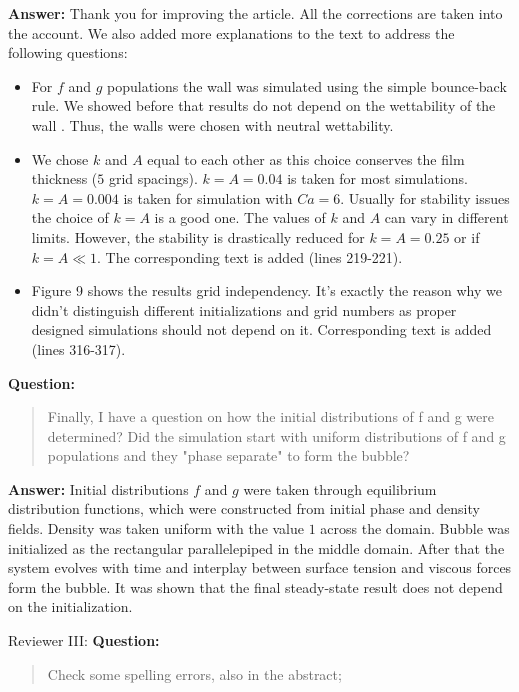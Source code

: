 \documentclass{article}
\begin{document}
\textbf{Answer:} Thank you for improving the article. All the corrections are taken into the
account. We also added more explanations to the text to address the following questions:
\begin{itemize}
 \item For $f$ and $g$ populations the wall was simulated using the simple bounce-back rule. We
showed before that results do not depend on the wettability of the wall
\cite{kuzmin-binary2d}. Thus, the walls were chosen with neutral wettability. 
 \item We chose $k$ and $A$ equal to each other as this choice conserves the film thickness ($5$
grid spacings). $k=A=0.04$ is taken for most simulations. $k=A=0.004$ is taken for simulation with 
$Ca=6$. Usually for stability issues the choice of $k=A$ is a good one. The values of $k$ and $A$
can vary in different limits. However, the stability is drastically reduced for $k=A=0.25$ or if
$k=A \ll 1$. The corresponding text is added (lines 219-221).
\item Figure 9 shows the results grid independency. It's exactly the reason why we didn't
distinguish different initializations and grid numbers as proper designed simulations should not
depend on it. Corresponding text is added (lines 316-317).
\end{itemize}

\textbf{Question:}
\begin{quotation}
Finally, I have a question on how the initial distributions of f and g were determined?  Did the
simulation start with uniform distributions of f and g populations and they "phase separate" to form
the bubble?
\end{quotation}

\textbf{Answer:} Initial distributions $f$ and $g$ were taken through equilibrium distribution
functions, which were constructed from initial phase and density fields. Density was taken uniform
with the value $1$ across the domain. Bubble was initialized as the rectangular parallelepiped in
the middle domain. After that the system evolves with time and interplay between surface tension
and viscous forces form the bubble. It was shown \cite{kuzmin-binary2d} that the final steady-state
result does not depend on the initialization. 
 
Reviewer III:
\textbf{Question:}
\begin{quotation}
Check some spelling errors, also in the abstract;
\end{quotation}
\end{document}
